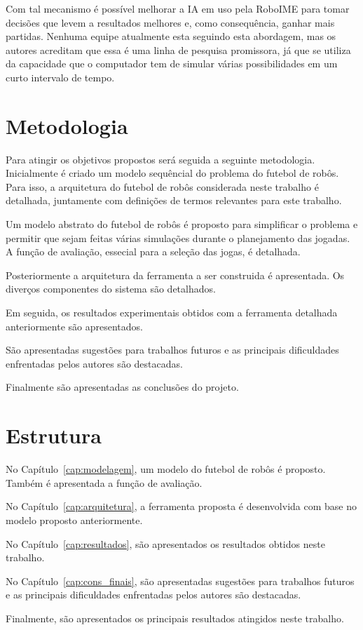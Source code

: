 Com tal mecanismo é possível melhorar a IA em uso pela RoboIME para tomar
decisões que levem a resultados melhores e, como consequência, ganhar mais
partidas. Nenhuma equipe atualmente esta seguindo esta abordagem, mas os autores
acreditam que essa é uma linha de pesquisa promissora, já que se utiliza da
capacidade que o computador tem de simular várias possibilidades em um curto
intervalo de tempo.

\section{Metodologia}

Para atingir os objetivos propostos será seguida a seguinte metodologia.
Inicialmente é criado um modelo sequêncial do problema do futebol de robôs.
Para isso, a arquitetura do futebol de robôs considerada neste trabalho é
detalhada, juntamente com definições de termos relevantes para este trabalho.

Um modelo abstrato do futebol de robôs é proposto para simplificar o problema
e permitir que sejam feitas várias simulações durante o planejamento das
jogadas. A função de avaliação, essecial para a seleção das jogas, é detalhada.

Posteriormente a arquitetura da ferramenta a ser construida é apresentada.
Os diverços componentes do sistema são detalhados.

Em seguida, os resultados experimentais obtidos com a ferramenta detalhada
anteriormente são apresentados.

São apresentadas sugestões para trabalhos futuros e as principais dificuldades
enfrentadas pelos autores são destacadas.

Finalmente são apresentadas as conclusões do projeto.

\section{Estrutura}

No Capítulo~\ref{cap:modelagem}, um modelo do futebol de robôs é proposto.
Também é apresentada a função de avaliação.

No Capítulo~\ref{cap:arquitetura}, a ferramenta proposta é desenvolvida com
base no modelo proposto anteriormente.

No Capítulo~\ref{cap:resultados}, são apresentados os resultados obtidos
neste trabalho.

No Capítulo~\ref{cap:cons_finais}, são apresentadas sugestões para trabalhos
futuros e as principais dificuldades enfrentadas pelos autores são destacadas.

Finalmente, são apresentados os principais resultados atingidos neste trabalho.

